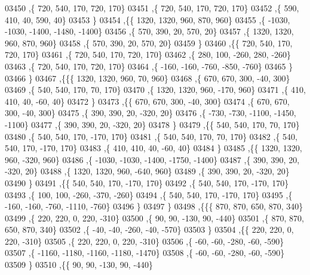 \begin{DoxyCode}
03450     ,\{   720,   540,   170,   720,   170\}
03451     ,\{   720,   540,   170,   720,   170\}
03452     ,\{   590,   410,    40,   590,    40\}
03453     \}
03454    ,\{\{  1320,  1320,   960,   870,   960\}
03455     ,\{ -1030, -1030, -1400, -1480, -1400\}
03456     ,\{   570,   390,    20,   570,    20\}
03457     ,\{  1320,  1320,   960,   870,   960\}
03458     ,\{   570,   390,    20,   570,    20\}
03459     \}
03460    ,\{\{   720,   540,   170,   720,   170\}
03461     ,\{   720,   540,   170,   720,   170\}
03462     ,\{   280,   100,  -260,   280,  -260\}
03463     ,\{   720,   540,   170,   720,   170\}
03464     ,\{  -160,  -160,  -760,  -850,  -760\}
03465     \}
03466    \}
03467   ,\{\{\{  1320,  1320,   960,    70,   960\}
03468     ,\{   670,   670,   300,   -40,   300\}
03469     ,\{   540,   540,   170,    70,   170\}
03470     ,\{  1320,  1320,   960,  -170,   960\}
03471     ,\{   410,   410,    40,   -60,    40\}
03472     \}
03473    ,\{\{   670,   670,   300,   -40,   300\}
03474     ,\{   670,   670,   300,   -40,   300\}
03475     ,\{   390,   390,    20,  -320,    20\}
03476     ,\{  -730,  -730, -1100, -1450, -1100\}
03477     ,\{   390,   390,    20,  -320,    20\}
03478     \}
03479    ,\{\{   540,   540,   170,    70,   170\}
03480     ,\{   540,   540,   170,  -170,   170\}
03481     ,\{   540,   540,   170,    70,   170\}
03482     ,\{   540,   540,   170,  -170,   170\}
03483     ,\{   410,   410,    40,   -60,    40\}
03484     \}
03485    ,\{\{  1320,  1320,   960,  -320,   960\}
03486     ,\{ -1030, -1030, -1400, -1750, -1400\}
03487     ,\{   390,   390,    20,  -320,    20\}
03488     ,\{  1320,  1320,   960,  -640,   960\}
03489     ,\{   390,   390,    20,  -320,    20\}
03490     \}
03491    ,\{\{   540,   540,   170,  -170,   170\}
03492     ,\{   540,   540,   170,  -170,   170\}
03493     ,\{   100,   100,  -260,  -370,  -260\}
03494     ,\{   540,   540,   170,  -170,   170\}
03495     ,\{  -160,  -160,  -760, -1110,  -760\}
03496     \}
03497    \}
03498   ,\{\{\{   870,   870,   650,   870,   340\}
03499     ,\{   220,   220,     0,   220,  -310\}
03500     ,\{    90,    90,  -130,    90,  -440\}
03501     ,\{   870,   870,   650,   870,   340\}
03502     ,\{   -40,   -40,  -260,   -40,  -570\}
03503     \}
03504    ,\{\{   220,   220,     0,   220,  -310\}
03505     ,\{   220,   220,     0,   220,  -310\}
03506     ,\{   -60,   -60,  -280,   -60,  -590\}
03507     ,\{ -1160, -1180, -1160, -1180, -1470\}
03508     ,\{   -60,   -60,  -280,   -60,  -590\}
03509     \}
03510    ,\{\{    90,    90,  -130,    90,  -440\}

\end{DoxyCode}
